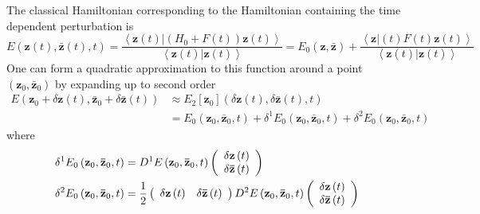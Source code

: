 \documentclass[aps,preprint]{revtex4}%
\begin{document}
The classical Hamiltonian corresponding to the Hamiltonian containing the time
dependent perturbation is
\begin{equation}
E\left(  \mathbf{z}\left(  t\right)  ,\mathbf{\bar{z}}\left(  t\right)
\mathbf{,}t\right)  =\frac{\left\langle \left.  \mathbf{z}\left(  t\right)
\right\vert \left(  H_{0}+F\left(  t\right)  \right)  \mathbf{z}\left(
t\right)  \right\rangle }{\left\langle \left.  \mathbf{z}\left(  t\right)
\right\vert \mathbf{z}\left(  t\right)  \right\rangle }=E_{0}\left(
\mathbf{z},\mathbf{\bar{z}}\right)  +\frac{\left\langle \left.  \mathbf{z}%
\right\vert \left(  t\right)  F\left(  t\right)  \mathbf{z}\left(  t\right)
\right\rangle }{\left\langle \left.  \mathbf{z}\left(  t\right)  \right\vert
\mathbf{z}\left(  t\right)  \right\rangle }%
\end{equation}
One can form a quadratic approximation to this function around a point
$\left(  \mathbf{z}_{0},\mathbf{\bar{z}}_{0}\right)  $ by expanding up to
second order
\begin{align}
E\left(  \mathbf{z}_{0}+\delta\mathbf{z}\left(  t\right)  ,\mathbf{\bar{z}%
}_{0}+\delta\mathbf{\bar{z}}\left(  t\right)  \right)   &  \approx
E_{2}\left[  \mathbf{z}_{0}\right]  \left(  \delta\mathbf{z}\left(  t\right)
,\delta\mathbf{\bar{z}}\left(  t\right)  ,t\right) \\
&  =E_{0}\left(  \mathbf{z}_{0},\mathbf{\bar{z}}_{0},t\right)  +\delta
^{1}E_{0}\left(  \mathbf{z}_{0},\mathbf{\bar{z}}_{0},t\right)  +\delta
^{2}E_{0}\left(  \mathbf{z}_{0},\mathbf{\bar{z}}_{0},t\right)
\end{align}
where
\begin{align}
\delta^{1}E_{0}\left(  \mathbf{z}_{0},\mathbf{\bar{z}}_{0},t\right)   &
=D^{1}E\left(  \mathbf{z}_{0},\mathbf{\bar{z}}_{0},t\right)  \left(
\begin{array}
[c]{c}%
\delta\mathbf{z}\left(  t\right) \\
\delta\mathbf{\bar{z}}\left(  t\right)
\end{array}
\right) \\
\delta^{2}E_{0}\left(  \mathbf{z}_{0},\mathbf{\bar{z}}_{0},t\right)   &
=\frac{1}{2}\left(
\begin{array}
[c]{cc}%
\delta\mathbf{z}\left(  t\right)  & \delta\mathbf{\bar{z}}\left(  t\right)
\end{array}
\right)  D^{2}E\left(  \mathbf{z}_{0},\mathbf{\bar{z}}_{0},t\right)  \left(
\begin{array}
[c]{c}%
\delta\mathbf{z}\left(  t\right) \\
\delta\mathbf{\bar{z}}\left(  t\right)
\end{array}
\right)
\end{align}
\end{document}
